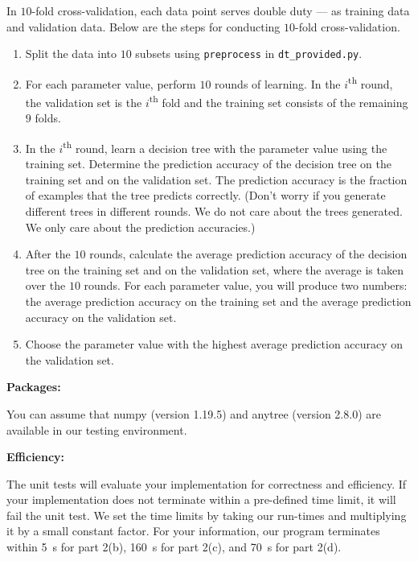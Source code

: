 \documentclass[12pt]{article}
\begin{document}
In $10$-fold cross-validation, each data point serves double duty --- as training data and validation data. Below are the steps for conducting $10$-fold cross-validation.
\begin{enumerate}

\item 
Split the data into $10$ subsets using \verb+preprocess+ in \verb+dt_provided.py+.

\item 
For each parameter value, perform $10$ rounds of learning. In the $i$\textsuperscript{th} round, the validation set is the $i$\textsuperscript{th} fold and the training set consists of the remaining $9$ folds.

\item 
In the $i$\textsuperscript{th} round, learn a decision tree with the parameter value using the training set. Determine the prediction accuracy of the decision tree on the training set and on the validation set. The prediction accuracy is the fraction of examples that the tree predicts correctly. (Don't worry if you generate different trees in different rounds. We do not care about the trees generated. We only care about the prediction accuracies.)

\item 
After the $10$ rounds, calculate the average prediction accuracy of the decision tree on the training set and on the validation set, where the average is taken over the $10$ rounds. For each parameter value, you will produce two numbers: the average prediction accuracy on the training set and the average prediction accuracy on the validation set. 
 
\item 
Choose the parameter value with the highest average prediction accuracy on the validation set. 
\end{enumerate}

{\bf Packages: }

You can assume that numpy (version 1.19.5) and anytree (version 2.8.0) are available in our testing environment.

{\bf Efficiency: }

The unit tests will evaluate your implementation for correctness and efficiency. If your implementation does not terminate within a pre-defined time limit, it will fail the unit test. We set the time limits by taking our run-times and multiplying it by a small constant factor. For your information, our program terminates within \SI{5}{s} for part 2(b), \SI{160}{s} for part 2(c), and \SI{70}{s} for part 2(d).
\end{document}
